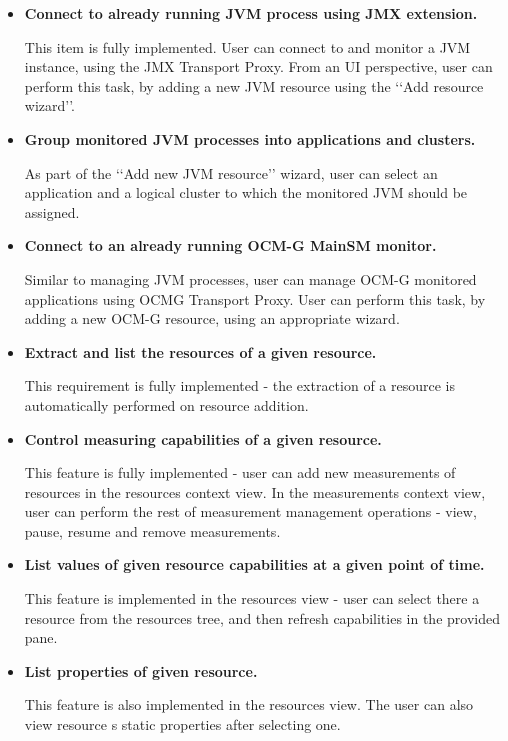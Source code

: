 \begin{itemize}

\item {\bf Connect to already running JVM process using JMX extension.}

This item is fully implemented. User can connect to and monitor a JVM instance, using the JMX Transport Proxy. From an UI perspective, user can perform this task, by adding a new JVM resource using the \lq\lq{}Add resource wizard\rq\rq{}.

\item {\bf Group monitored JVM processes into applications and clusters.}

As part of the \lq\lq{}Add new JVM resource\rq\rq{} wizard, user can select an application and a logical cluster to which the monitored JVM should be assigned.

\item {\bf Connect to an already running OCM-G MainSM monitor.}

Similar to managing JVM processes, user can manage OCM-G monitored applications using OCMG Transport Proxy. User can perform this task, by adding a new OCM-G resource, using an appropriate wizard.

\item {\bf Extract and list the resources of a given resource.}

This requirement is fully implemented - the extraction of a resource is automatically performed on resource addition.

\item {\bf Control measuring capabilities of a given resource.}

This feature is fully implemented - user can add new measurements of resources in the resources context view. In the measurements context view, user can perform the rest of measurement management operations - view, pause, resume and remove measurements.

\item {\bf List values of given resource capabilities at a given point of time.}

This feature is implemented in the resources view - user can select there a resource from the resources tree, and then refresh capabilities in the provided pane.

\item {\bf List properties of given resource.}

This feature is also implemented in the resources view. The user can also view resource
s static properties after selecting one.


\end{itemize}

